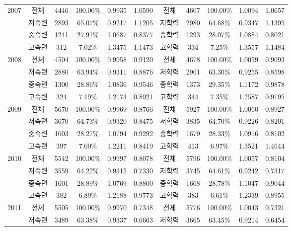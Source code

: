 {\begin{longtable}[htbp]{c|ccccc|ccccc}
    \hline \multirow[t]{4}{*}{2007}  & 전체    & 4446  & 100.00\% & 0.9935 & 1.0590  & 전체    & 4607  & 100.00\% & 1.0094 & 1.0657  \\
    & 저숙련   & 2893  & 65.07\% & 0.9217 & 1.1205 & 저학력   & 2980  & 64.68\% & 0.9347 & 1.1395  \\
    & 중숙련   & 1241  & 27.91\% & 1.0687 & 0.8377 & 중학력   & 1293  & 28.07\% & 1.0884 & 0.8021  \\
    & 고숙련   & 312   & 7.02\% & 1.3475 & 1.1473 & 고학력   & 334   & 7.25\% & 1.3557 & 1.1484  \\
    \hline \multirow[t]{4}{*}{2008}  & 전체    & 4504  & 100.00\% & 0.9958 & 0.9120  & 전체    & 4678  & 100.00\% & 1.0059 & 0.9093  \\
    & 저숙련   & 2880  & 63.94\% & 0.9311 & 0.8876 & 저학력   & 2961  & 63.30\% & 0.9255 & 0.8598  \\
    & 중숙련   & 1300  & 28.86\% & 1.0836 & 0.9546 & 중학력   & 1373  & 29.35\% & 1.1172 & 0.9878  \\
    & 고숙련   & 324   & 7.19\% & 1.2173 & 0.8921 & 고학력   & 344   & 7.35\% & 1.2587 & 0.9195  \\
    \hline \multirow[t]{4}{*}{2009}  & 전체    & 5670  & 100.00\% & 0.9969 & 0.8766  & 전체    & 5927  & 100.00\% & 1.0060 & 0.8927  \\
    & 저숙련   & 3670  & 64.73\% & 0.9320 & 0.8475 & 저학력   & 3835  & 64.70\% & 0.9226 & 0.8201  \\
    & 중숙련   & 1603  & 28.27\% & 1.0794 & 0.9292 & 중학력   & 1679  & 28.33\% & 1.0916 & 0.8102  \\
    & 고숙련   & 397   & 7.00\% & 1.2211 & 0.8419 & 고학력   & 413   & 6.97\% & 1.3521 & 1.4644  \\
    \hline \multirow[t]{4}{*}{2010}  & 전체    & 5542  & 100.00\% & 0.9997 & 0.8078  & 전체    & 5796  & 100.00\% & 1.0057 & 0.8104  \\
    & 저숙련   & 3559  & 64.22\% & 0.9315 & 0.7330 & 저학력   & 3745  & 64.61\% & 0.9242 & 0.7317  \\
    & 중숙련   & 1601  & 28.89\% & 1.0769 & 0.8800 & 중학력   & 1668  & 28.78\% & 1.1047 & 0.9044  \\
    & 고숙련   & 382   & 6.89\% & 1.2188 & 0.9773 &  고학력   & 383   & 6.61\% & 1.2339 & 0.8955  \\
    \hline \multirow[t]{4}{*}{2011}  & 전체    & 5505  & 100.00\% & 0.9970 & 0.7348  & 전체    & 5776  & 100.00\% & 1.0043 & 0.7321  \\
    & 저숙련   & 3489  & 63.38\% & 0.9337 & 0.6663 & 저학력   & 3665  & 63.45\% & 0.9214 & 0.6454  \\

\end{longtable}}
